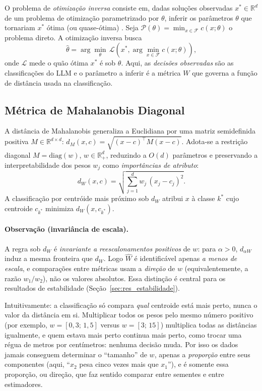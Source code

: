\documentclass[12pt,a4paper]{article}
\newcommand{\West}{\ensuremath{\hat{W}}}   %
\begin{document}
O problema de \emph{otimização inversa} consiste em, dadas soluções observadas
$x^* \in \mathbb{R}^d$ de um problema de otimização parametrizado por $\theta$, inferir os
parâmetros $\theta$ que tornariam $x^*$ ótima (ou quase-ótima) \cite{chanInverseOptimization2025}.
Seja $\mathcal{P}(\theta) = \min_{x \in \mathcal{F}} c(x; \theta)$ o problema direto. A
otimização inversa busca
\begin{equation}
  \hat{\theta} = \arg\min_{\theta} \,
  \mathcal{L}\!\left(x^*, \arg\min_{x \in \mathcal{F}} c(x; \theta)\right),
\end{equation}
onde $\mathcal{L}$ mede o quão ótima $x^*$ é sob $\theta$. Aqui, as \emph{decisões
observadas} são as classificações do LLM e o parâmetro a inferir é a métrica $W$ que governa
a função de distância usada na classificação.

\subsection{Métrica de Mahalanobis Diagonal}

A distância de Mahalanobis generaliza a Euclidiana por uma matriz semidefinida positiva
$M \in \mathbb{R}^{d \times d}$: $d_M(x,c) = \sqrt{(x-c)^\top M (x-c)}$. Adota-se a
restrição diagonal $M = \mathrm{diag}(w)$, $w \in \mathbb{R}^d_+$, reduzindo a $O(d)$
parâmetros e preservando a interpretabilidade dos pesos $w_j$ como \emph{importâncias de
atributo}:
\begin{equation}
  d_W(x, c) = \sqrt{\sum_{j=1}^d w_j\,(x_j - c_j)^2}.
  \label{eq:mahalanobis}
\end{equation}
A classificação por centróide mais próximo sob $d_W$ atribui $x$ à classe $k^*$ cujo centroide
$c_{k^*}$ minimiza $d_W(x, c_{k^*})$.

\paragraph{Observação (invariância de escala).}
A regra sob $d_W$ é \emph{invariante a reescalonamentos positivos} de $w$: para $\alpha>0$,
$d_{\alpha W}$ induz a mesma fronteira que $d_W$. Logo \West{} é identificável apenas
\emph{a menos de escala}, e comparações entre métricas usam a \emph{direção} de $w$
(equivalentemente, a razão $w_1/w_2$), não os valores absolutos. Essa distinção é central
para os resultados de estabilidade (Seção~\ref{sec:res_estabilidade}).

Intuitivamente: a classificação só compara \emph{qual} centroide está mais perto, nunca o
valor da distância em si. Multiplicar todos os pesos pelo mesmo número positivo (por
exemplo, $w = [0{,}3;\,1{,}5]$ versus $w = [3;\,15]$) multiplica todas as distâncias
igualmente, e quem estava mais perto continua mais perto, como trocar uma régua de metros
por centímetros: nenhuma decisão muda. Por isso os dados jamais conseguem determinar o
``tamanho'' de $w$, apenas a \emph{proporção} entre seus componentes (aqui, ``$x_2$ pesa
cinco vezes mais que $x_1$''), e é somente essa proporção, ou direção, que faz sentido
comparar entre sementes e entre estimadores.
\end{document}
